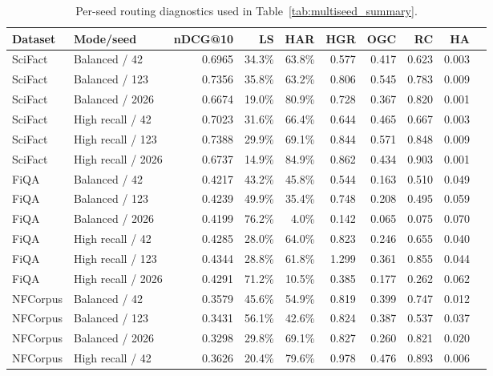 \begin{table}[!htbp]
\centering
\caption{Per-seed routing diagnostics used in Table~\ref{tab:multiseed_summary}.}
\label{tab:multiseed_raw}
\scriptsize
\setlength{\tabcolsep}{3.0pt}
\begin{tabular}{llrrrrrrrr}
\toprule
Dataset & Mode/seed & nDCG@10 & LS & HAR & HGR & OGC & RC & HA \\
\midrule
SciFact & Balanced / 42 & 0.6965 & 34.3\% & 63.8\% & 0.577 & 0.417 & 0.623 & 0.003 \\
SciFact & Balanced / 123 & 0.7356 & 35.8\% & 63.2\% & 0.806 & 0.545 & 0.783 & 0.009 \\
SciFact & Balanced / 2026 & 0.6674 & 19.0\% & 80.9\% & 0.728 & 0.367 & 0.820 & 0.001 \\
SciFact & High recall / 42 & 0.7023 & 31.6\% & 66.4\% & 0.644 & 0.465 & 0.667 & 0.003 \\
SciFact & High recall / 123 & 0.7388 & 29.9\% & 69.1\% & 0.844 & 0.571 & 0.848 & 0.009 \\
SciFact & High recall / 2026 & 0.6737 & 14.9\% & 84.9\% & 0.862 & 0.434 & 0.903 & 0.001 \\
\midrule
FiQA & Balanced / 42 & 0.4217 & 43.2\% & 45.8\% & 0.544 & 0.163 & 0.510 & 0.049 \\
FiQA & Balanced / 123 & 0.4239 & 49.9\% & 35.4\% & 0.748 & 0.208 & 0.495 & 0.059 \\
FiQA & Balanced / 2026 & 0.4199 & 76.2\% & 4.0\% & 0.142 & 0.065 & 0.075 & 0.070 \\
FiQA & High recall / 42 & 0.4285 & 28.0\% & 64.0\% & 0.823 & 0.246 & 0.655 & 0.040 \\
FiQA & High recall / 123 & 0.4344 & 28.8\% & 61.8\% & 1.299 & 0.361 & 0.855 & 0.044 \\
FiQA & High recall / 2026 & 0.4291 & 71.2\% & 10.5\% & 0.385 & 0.177 & 0.262 & 0.062 \\
\midrule
NFCorpus & Balanced / 42 & 0.3579 & 45.6\% & 54.9\% & 0.819 & 0.399 & 0.747 & 0.012 \\
NFCorpus & Balanced / 123 & 0.3431 & 56.1\% & 42.6\% & 0.824 & 0.387 & 0.537 & 0.037 \\
NFCorpus & Balanced / 2026 & 0.3298 & 29.8\% & 69.1\% & 0.827 & 0.260 & 0.821 & 0.020 \\
NFCorpus & High recall / 42 & 0.3626 & 20.4\% & 79.6\% & 0.978 & 0.476 & 0.893 & 0.006 \\

\end{tabular}
\end{table}

